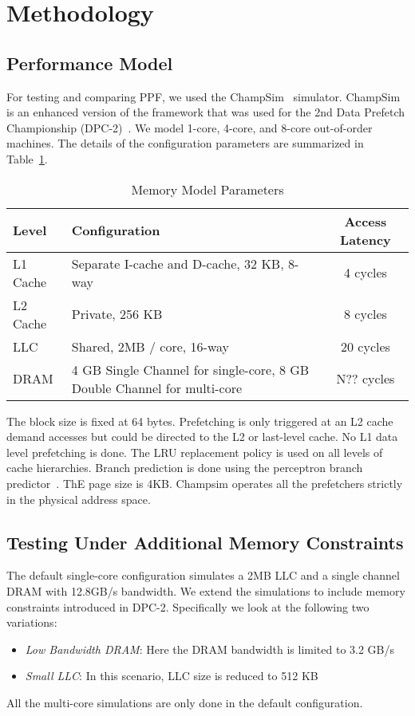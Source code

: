 \section{Methodology}
\label{Method}

\subsection{Performance Model}
\label{Method-Model}
For testing and comparing PPF, we used the ChampSim~\cite{Champsim} simulator.
ChampSim is an enhanced version of the framework that was used for the 2nd
Data Prefetch Championship (DPC-2)~\cite{DPC_2}. We model 1-core, 4-core, and
8-core out-of-order machines. The details of the configuration parameters are
summarized in Table~\ref{tab:Sim_params}.

\begin{table}[]
    \centering
    \begin{tabular}{|l|p{3.6cm}|c|}
    \hline
    Level & Configuration & Access Latency \\
    \hline
         L1 Cache & Separate I-cache and D-cache, 32 KB, 8-way & 4 cycles\\
         L2 Cache & Private, 256 KB & 8 cycles\\
         LLC & Shared, 2MB / core, 16-way & 20 cycles\\
         DRAM & 4 GB Single Channel for single-core, 8 GB Double Channel for multi-core & N?? cycles\\
    \hline
    \end{tabular}
    \caption{Memory Model Parameters}
    \label{tab:Sim_params}
\end{table}


The block size is fixed at 64 bytes. Prefetching is only triggered at an L2 cache
demand accesses but could be directed to the L2 or last-level cache. No L1
data level prefetching is done. The LRU replacement policy is used on all levels
of cache hierarchies. Branch prediction is done using the perceptron branch
predictor~\cite{Perc_Branch}.  ThE page size is 4KB.  Champsim operates
all the prefetchers strictly in the physical address space.

\subsection{Testing Under Additional Memory Constraints}
\label{Method-AdditionalMem}
The default single-core configuration simulates a 2MB LLC and a single
channel DRAM with 12.8GB/s bandwidth.  We extend the simulations to
include memory constraints introduced in DPC-2.  Specifically we look
at the following two variations:
\begin{itemize}
\item \textit{Low Bandwidth DRAM}: Here the DRAM bandwidth is limited
  to 3.2 GB/s
\item \textit{Small LLC}: In this scenario, LLC size is reduced to 512
  KB
\end{itemize}
All the multi-core simulations are only done in the default
configuration.

